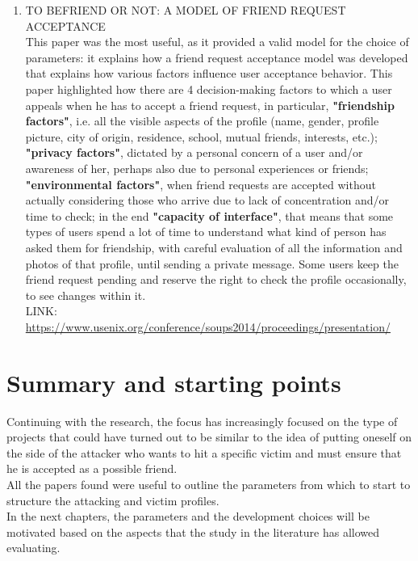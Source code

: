 \begin{enumerate}
	\item 
	\textsc{TO BEFRIEND OR NOT: A MODEL OF FRIEND REQUEST ACCEPTANCE}
	\\ This paper was the most useful, as it provided a valid model for the choice of parameters: it explains how a friend request acceptance model was developed that explains how various factors influence user acceptance behavior. This paper highlighted how there are 4 decision-making factors to which a user appeals when he has to accept a friend request, in particular, \textbf{"friendship factors"}, i.e. all the visible aspects of the profile (name, gender, profile picture, city of origin, residence, school, mutual friends, interests, etc.); \textbf{"privacy factors"}, dictated by a personal concern of a user and/or awareness of her, perhaps also due to personal experiences or friends; \textbf{"environmental factors"}, when friend requests are accepted without actually considering those who arrive due to lack of concentration and/or time to check; in the end \textbf{"capacity of interface"}, that means that some types of users spend a lot of time to understand what kind of person has asked them for friendship, with careful evaluation of all the information and photos of that profile, until sending a private message. Some users keep the friend request pending and reserve the right to check the profile occasionally, to see changes within it.
	\\LINK: \href{https://www.usenix.org/conference/soups2014/proceedings/presentation/rashtian}{https://www.usenix.org/conference/soups2014/proceedings/presentation/}
\end{enumerate}

\section{Summary and starting points}
Continuing with the research, the focus has increasingly focused on the type of projects that could have turned out to be similar to the idea of putting oneself on the side of the attacker who wants to hit a specific victim and must ensure that he is accepted as a possible friend. \\All the papers found were useful to outline the parameters from which to start to structure the attacking and victim profiles.\\In the next chapters, the parameters and the development choices will be motivated based on the aspects that the study in the literature has allowed evaluating.
